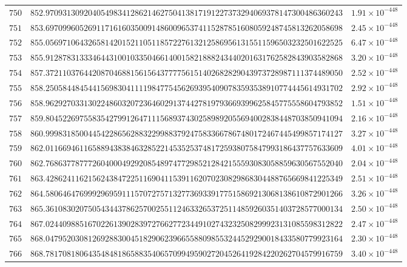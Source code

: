 \documentclass[12pt,reqno]{amsart}
\theoremstyle{remark}
\begin{document}
\begin{longtable}{clc}
$750$ & $852.9709313092040549834128621462750413817191227373294069378147300486360243$ & $1.91\times 10^{-448}$ \\
$751$ & $853.6970996052691171616035009148600965374115287851608059248745813262058698$ & $2.45\times 10^{-448}$ \\
$752$ & $855.0569710643265814201521105118572276132125869561315511596503232501622525$ & $6.47\times 10^{-448}$ \\
$753$ & $855.9128783133346443100103350466140015821888243440201631762582843903582868$ & $3.20\times 10^{-448}$ \\
$754$ & $857.3721103764420870468815615643777756151402682829043973728987111374489050$ & $2.52\times 10^{-448}$ \\
$755$ & $858.2505844845441569830411119847754562693954090783593538910774445614931702$ & $2.92\times 10^{-448}$ \\
$756$ & $858.9629270331302248603207236460291374427819793669399625845775558604793852$ & $1.51\times 10^{-448}$ \\
$757$ & $859.8045226975583542799126471115689374302589892055694002838448703850941094$ & $2.16\times 10^{-448}$ \\
$758$ & $860.9998318500445422865628832299883792475833667867480172467445499857174127$ & $3.27\times 10^{-448}$ \\
$759$ & $862.0116694611658894383846328522145352537481725938075847993186437757633609$ & $4.01\times 10^{-448}$ \\
$760$ & $862.7686377877726040004929208548974772985212842155593083058859630567552040$ & $2.04\times 10^{-448}$ \\
$761$ & $863.4286241162156243847225116904115391162070230829868304488765669841225349$ & $2.51\times 10^{-448}$ \\
$762$ & $864.5806464769992969591115707275713277369339177515869213068138610872901266$ & $3.26\times 10^{-448}$ \\
$763$ & $865.3610830207505434437862570025511246332653725114859260351403728577000134$ & $2.50\times 10^{-448}$ \\
$764$ & $867.0244098851670226139028397276627723449102743232508299923131085598312822$ & $2.47\times 10^{-448}$ \\
$765$ & $868.0479520308126928830045182906239665588098553244529290018433580779923164$ & $2.30\times 10^{-448}$ \\
$766$ & $868.7817081806435484818658835406570994959027204526419284220262704579916759$ & $3.40\times 10^{-448}$ \\

\end{longtable}
\end{document}
